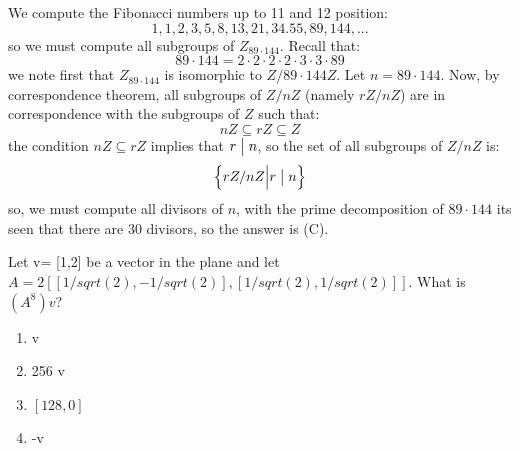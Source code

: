 \documentclass[12pt]{report}
\theoremstyle{largebreak}
\newcommand\divides{\ensuremath{\bigm|}}
\begin{document}
    \begin{sol}
        We compute the Fibonacci numbers up to 11 and 12 position:
        \begin{equation*}
            1, 1, 2, 3, 5, 8, 13, 21, 34. 55, 89, 144,...
        \end{equation*}
        so we must compute all subgroups of $Z_{ 89\cdot 144}$. Recall that:
        \begin{equation*}
            89\cdot 144=2\cdot 2\cdot2\cdot 2\cdot 3\cdot 3\cdot 89 
        \end{equation*}
        we note first that $Z_{ 89\cdot 144}$ is isomorphic to $Z/{ 89\cdot 144}Z$. Let $n=89\cdot 144$. Now, by correspondence theorem, all subgroups of $Z/{n}Z$ (namely $rZ/nZ$) are in correspondence with the subgroups of $Z$ such that:
        \begin{equation*}
            nZ\subseteq rZ\subseteq Z
        \end{equation*}
        the condition $nZ\subseteq rZ$ implies that $r\divides n$, so the set of all subgroups of $Z/nZ$ is:
        \begin{equation*}
            \left\{rZ/nZ\Big|r\divides n \right\}
        \end{equation*}
        so, we must compute all divisors of $n$, with the prime decomposition of $89\cdot 144$ its seen that there are 30 divisors, so the answer is (C).
    \end{sol}

    \begin{excer}
        Let v= [1,2] be a vector in the plane and let $A = 2[[1/sqrt(2), - 1/sqrt(2)], [1/sqrt(2), 1/sqrt(2)]]$. What is $(A^8)v$?
        \begin{enumerate}[label = \textit{(\Alph*)}]
            \item v
            \item 256 v
            \item $[128, 0]$
            \item -v
        \end{enumerate}
    \end{excer}
\end{document}
